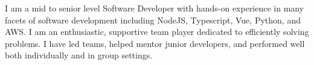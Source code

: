 
\begin{cvparagraph}
I am a mid to senior level Software Developer with hands-on experience in many facets of software development including
NodeJS, Typescript, Vue, Python, and AWS.  
I am an enthusiastic, supportive team player dedicated to efficiently solving problems.
I have led teams, helped mentor junior developers, and performed well both individually and in group settings.
\end{cvparagraph}